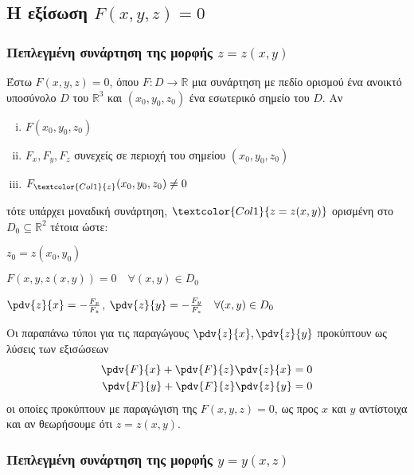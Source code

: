     \subsection{Η εξίσωση \ensuremath{F(x,y,z) = 0}}

    \subsubsection{Πεπλεγμένη συνάρτηση της μορφής \ensuremath{z=z(x,y)}}

    Έστω $ F(x,y,z) = 0 $, όπου $F\colon D \to \mathbb{R}$ μια συνάρτηση με πεδίο ορισμού 
    ένα ανοικτό υποσύνολο $ D $ του $ \mathbb{R}^{3}  $ και $ (x_0,y_0,z_0) $ ένα 
    εσωτερικό σημείο του $ D $. Αν
    \begin{enumerate}[(i)]
      \item $ F(x_0,y_0,z_0) $
      \item $ F_x, F_y, F_z $ συνεχείς σε περιοχή του σημείου $ (x_0,y_0,z_0) $
      \item $ F_{\textcolor{Col1}{z}}(x_0,y_0,z_0) \neq 0 $
    \end{enumerate}
    τότε υπάρχει μοναδική συνάρτηση, $ \textcolor{Col1}{z=z(x,y)} $ ορισμένη στο 
    $ D_0 \subseteq \mathbb{R}^{2} $ τέτοια ώστε:
    \begin{myitemize}
      \item $ z_0 = z(x_0,y_0) $
      \item $ F(x,y,z(x,y)) = 0  \quad \forall (x,y)\in  D_0 $
      \item $ \pdv{z}{x} = - \frac{F_x}{F_z} $, $ \pdv{z}{y} = - \frac{F_y}{F_z}\quad 
        \forall (x,y) \in D_0$
    \end{myitemize}

    \begin{rem}
      Οι παραπάνω τύποι για τις παραγώγους $ \pdv{z}{x}, \pdv{z}{y} $ προκύπτουν 
      ως λύσεις των εξισώσεων  
      \begin{align*}	
        \pdv{F}{x} + \pdv{F}{z}\pdv{z}{x} &= 0 \\
        \pdv{F}{y} + \pdv{F}{z}\pdv{z}{y} &= 0 
      \end{align*}
      οι οποίες προκύπτουν με παραγώγιση της $ F(x,y,z) = 0 $, ως προς $x$ και $y$ 
      αντίστοιχα και  αν θεωρήσουμε ότι $ z=z(x,y) $.
    \end{rem}

    \subsubsection{Πεπλεγμένη συνάρτηση της μορφής \ensuremath{y=y(x,z)}}

